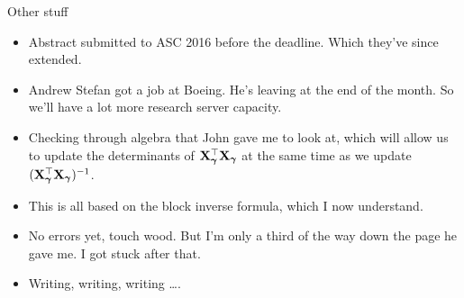 \documentclass{beamer}
\begin{document}
\begin{frame}{Other stuff}
\begin{itemize}
\item Abstract submitted to ASC 2016 before the deadline. Which they've since extended.
\item Andrew Stefan got a job at Boeing. He's leaving at the end of the month. So we'll have a lot more
research server capacity.
\item Checking through algebra that John gave me to look at, which will allow us to update the determinants
of ${\bf X}_{\boldsymbol \gamma}^\top {\bf X}_{\boldsymbol \gamma}$ at the same time as we update $({\bf X}_{\boldsymbol \gamma}^\top {\bf X}_{\boldsymbol \gamma})^{-1}$.
\item This is all based on the block inverse formula, which I now understand.
\item No errors yet, touch wood. But I'm only a third of the way down the page he gave me. I got stuck after
that.
\item Writing, writing, writing \ldots.
\end{itemize}
\end{frame}
\end{document}
